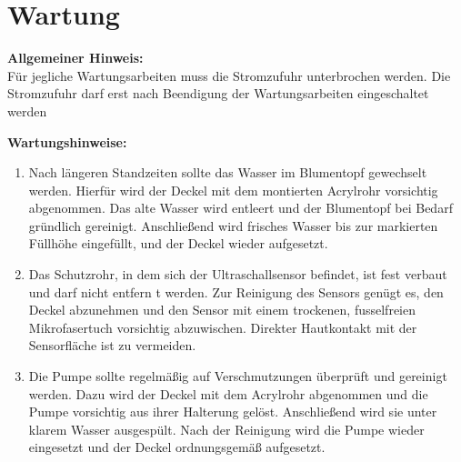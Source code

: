 %
%
%

\chapter{Wartung}
	\textbf{Allgemeiner Hinweis:}\\
	Für jegliche Wartungsarbeiten muss die Stromzufuhr unterbrochen werden. Die Stromzufuhr darf erst nach Beendigung der Wartungsarbeiten eingeschaltet werden 

\textbf{Wartungshinweise:}
	\begin{enumerate}
		\item Nach längeren Standzeiten sollte das Wasser im Blumentopf gewechselt werden. Hierfür wird der Deckel mit dem montierten Acrylrohr vorsichtig abgenommen. Das alte Wasser wird entleert und der Blumentopf bei Bedarf gründlich gereinigt. Anschließend wird frisches Wasser bis zur markierten Füllhöhe eingefüllt, und der Deckel wieder aufgesetzt.
		\item Das Schutzrohr, in dem sich der Ultraschallsensor befindet, ist fest verbaut und darf nicht entfern t werden. Zur Reinigung des Sensors genügt es, den Deckel abzunehmen und den Sensor mit einem trockenen, fusselfreien Mikrofasertuch vorsichtig abzuwischen. Direkter Hautkontakt mit der Sensorfläche ist zu vermeiden.
		\item Die Pumpe sollte regelmäßig auf Verschmutzungen überprüft und gereinigt werden. Dazu wird der Deckel mit dem Acrylrohr abgenommen und die Pumpe vorsichtig aus ihrer Halterung gelöst. Anschließend wird sie unter klarem Wasser ausgespült. Nach der Reinigung wird die Pumpe wieder eingesetzt und der Deckel ordnungsgemäß aufgesetzt.
	\end{enumerate}
	 


